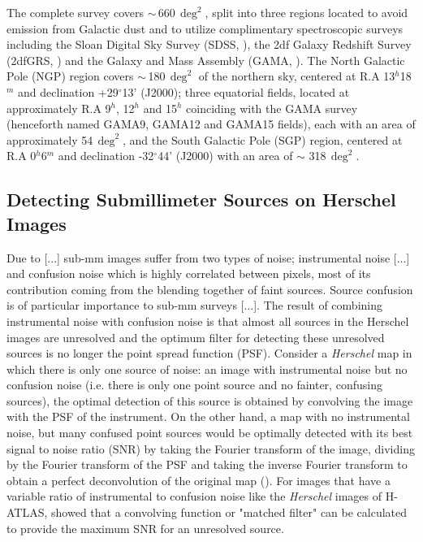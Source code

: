 The complete survey covers $\sim$\,660\,$\deg^2$, split into three regions located to avoid emission from Galactic dust and to utilize complimentary spectroscopic surveys including the Sloan Digital Sky Survey (SDSS, \citealt{York_2000}), the 2df Galaxy Redshift Survey (2dfGRS, \citealt{Colless_2001}) and the Galaxy and Mass Assembly (GAMA, \citealt{Driver_2009}). The North Galactic Pole (NGP) region covers $\sim$\,180\,$\deg^2$ of the northern sky, centered at R.A 13$^{h}$18$^{m}$ and declination +29$^{\circ}$13' (J2000); three equatorial fields, located at approximately R.A 9$^{h}$, 12$^{h}$ and 15$^{h}$ coinciding with the GAMA survey (henceforth named GAMA9, GAMA12 and GAMA15 fields), each with an area of approximately 54\,$\deg^2$, and the South Galactic Pole (SGP) region, centered at R.A 0$^{h}$6$^{m}$ and declination -32$^{\circ}$44' (J2000) with an area of $\sim$ 318\,$\deg^2$. 

\subsection{Detecting Submillimeter Sources on Herschel Images}
\label{sec:Detecting Submillimeter Sources on Herschel Images}

Due to [...] sub-mm images suffer from two types of noise; instrumental noise [...] and confusion noise which is highly correlated between pixels, most of its contribution coming from the blending together of faint sources. Source confusion is of particular importance to sub-mm surveys [...]. The result of combining instrumental noise with confusion noise is that almost all sources in the Herschel images are unresolved and the optimum filter for detecting these unresolved sources is no longer the point spread function (PSF). Consider a \textit{Herschel} map in which there is only one source of noise: an image with instrumental noise but no confusion noise (i.e. there is only one point source and no fainter, confusing sources), the optimal detection of this source is obtained by convolving the image with the PSF of the instrument. On the other hand, a map with no instrumental noise, but many confused point sources would be optimally detected with its best signal to noise ratio (SNR) by taking the Fourier transform of the image, dividing by the Fourier transform of the PSF and taking the inverse Fourier transform to obtain a perfect deconvolution of the original map (\citealt{Valiante_2016}). For images that have a variable ratio of instrumental to confusion noise like the \textit{Herschel} images of H-ATLAS, \citealt{Chapin_2011} showed that a convolving function or "matched filter" can be calculated to provide the maximum SNR for an unresolved source.

